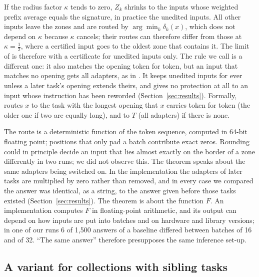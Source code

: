 \begin{remark}
If the radius factor $\kappa$ tends to zero, $Z_k$ shrinks to the inputs whose weighted prefix
average equals the signature, in practice the unedited inputs. All other inputs leave the zones and are routed by $\arg\min_k \delta_k(x)$, which does not depend on $\kappa$ because $\kappa$ cancels;
their routes can therefore differ from those at $\kappa = \tfrac12$, where a certified input goes to the oldest zone that contains it. The limit of \cert{} is therefore
\nearest{} with a certificate for unedited inputs only. The rule we call \keyswitch{} is a different
one: it also matches the opening token for token, but an input that matches no opening gets all
adapters, as in \plain{}. It keeps unedited inputs for ever unless a later task's opening extends theirs, and gives no protection at all to an
input whose instruction has been reworded (Section~\ref{sec:results}). Formally, \keyswitch{} routes $x$ to the task with the
longest opening that $x$ carries token for token (the older one if two are equally long), and to $T$ (all adapters) if there is none.
\end{remark}

\begin{remark}
The route is a deterministic function of the token sequence, computed in 64-bit floating point;
positions that only pad a batch contribute exact zeros. Rounding could in principle decide an
input that lies almost exactly on the border of a zone differently in two runs; we did not observe
this. The theorem speaks about the same adapters being switched on. In the implementation the
adapters of later tasks are multiplied by zero rather than removed, and in every case we compared
the answer was identical, as a string, to the answer given before those tasks existed
(Section~\ref{sec:results}). The theorem is about the function $F$. An implementation computes $F$
in floating-point arithmetic, and its output can depend on how inputs are put into batches and on
hardware and library versions; in one of our runs 6 of 1{,}500 answers of a baseline differed
between batches of 16 and of 32. ``The same answer'' therefore presupposes the same inference
set-up.
\end{remark}

\subsection{A variant for collections with sibling tasks}
\label{sec:exactfirst}

